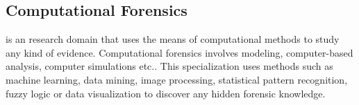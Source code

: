 \subsection{Computational Forensics} is an research domain that uses the means of computational methods to study any kind of evidence. Computational forensics involves modeling, computer-based analysis, computer simulations etc.. This specialization uses methods such as machine learning, data mining, image processing, statistical pattern recognition, fuzzy logic or data visualization to discover any hidden forensic knowledge. 

%
%
%
%
%
%
%
%
%
%
%
%		
%
%
%
%
%
%



